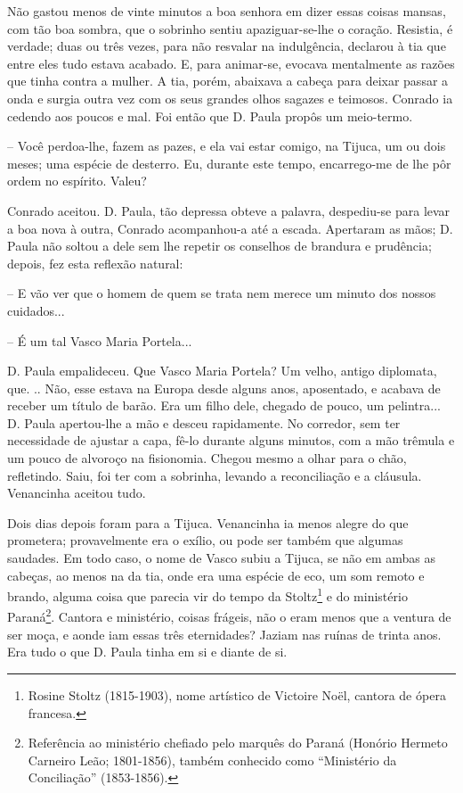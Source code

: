 Não gastou menos de vinte minutos a boa senhora em dizer essas coisas
mansas, com tão boa sombra, que o sobrinho sentiu apaziguar-se-lhe o
coração. Resistia, é verdade; duas ou três vezes, para não resvalar na
indulgência, declarou à tia que entre eles tudo estava acabado. E, para
animar-se, evocava mentalmente as razões que tinha contra a mulher. A
tia, porém, abaixava a cabeça para deixar passar a onda e surgia outra
vez com os seus grandes olhos sagazes e teimosos. Conrado ia cedendo aos
poucos e mal. Foi então que D. Paula propôs um meio-termo.

-- Você perdoa-lhe, fazem as pazes, e ela vai estar comigo, na Tijuca,
um ou dois meses; uma espécie de desterro. Eu, durante este tempo,
encarrego-me de lhe pôr ordem no espírito. Valeu?

Conrado aceitou. D. Paula, tão depressa obteve a palavra, despediu-se
para levar a boa nova à outra, Conrado acompanhou-a até a escada.
Apertaram as mãos; D. Paula não soltou a dele sem lhe repetir os
conselhos de brandura e prudência; depois, fez esta reflexão natural:

-- E vão ver que o homem de quem se trata nem merece um minuto dos
nossos cuidados...

-- É um tal Vasco Maria Portela...

D. Paula empalideceu. Que Vasco Maria Portela? Um velho, antigo
diplomata, que. .. Não, esse estava na Europa desde alguns anos,
aposentado, e acabava de receber um título de barão. Era um filho dele,
chegado de pouco, um pelintra... D. Paula apertou-lhe a mão e desceu
rapidamente. No corredor, sem ter necessidade de ajustar a capa, fê-lo
durante alguns minutos, com a mão trêmula e um pouco de alvoroço na
fisionomia. Chegou mesmo a olhar para o chão, refletindo. Saiu, foi ter
com a sobrinha, levando a reconciliação e a cláusula. Venancinha aceitou
tudo.

Dois dias depois foram para a Tijuca. Venancinha ia menos alegre do que
prometera; provavelmente era o exílio, ou pode ser também que algumas
saudades. Em todo caso, o nome de Vasco subiu a Tijuca, se não em ambas
as cabeças, ao menos na da tia, onde era uma espécie de eco, um som
remoto e brando, alguma coisa que parecia vir do tempo da
Stoltz\footnote{Rosine Stoltz (1815-1903), nome artístico de Victoire
  Noël, cantora de ópera francesa.} e do ministério Paraná\footnote{Referência
  ao ministério chefiado pelo marquês do Paraná (Honório Hermeto
  Carneiro Leão; 1801-1856), também conhecido como ``Ministério da
  Conciliação'' (1853-1856).}. Cantora e ministério, coisas frágeis, não
o eram menos que a ventura de ser moça, e aonde iam essas três
eternidades? Jaziam nas ruínas de trinta anos. Era tudo o que D. Paula
tinha em si e diante de si.

